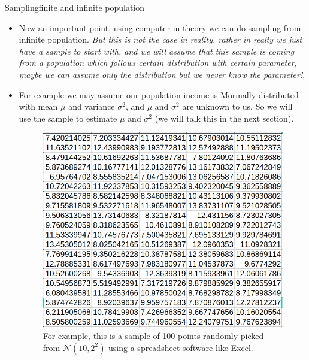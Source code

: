 \documentclass[8pt, usepdftitle=false]{beamer}
\begin{document}
\begin{frame}[allowframebreaks]{Sampling}{finite and infinite population}
\begin{itemize}
  \item Now an important point, using computer in theory we can do sampling from infinite population. \emph{But this is not the case in reality, rather in realty we just have a sample to start with, and we will assume that this sample is coming from a population which follows certain distribution with certain parameter, maybe we can assume only the distribution but we never know the parameter!}. 


  \item For example we may assume our population income is Mormally distributed with mean $\mu$ and variance $\sigma^2$, and $\mu$ and $\sigma^2$ are unknown to us. So we will use the sample to estimate $\mu$ and $\sigma^2$ (we will talk this in the next section). 



  \framebreak


  \begin{figure}
      \includegraphics[scale = .35]{Images/100 Samples from Normal.png}
      \caption{For example, this is a sample of 100 points randomly picked from $\mathcal{N}(10, 2^2)$ using a spreadsheet software like Excel.}
  \end{figure}









\end{itemize}
\end{frame}
\end{document}
